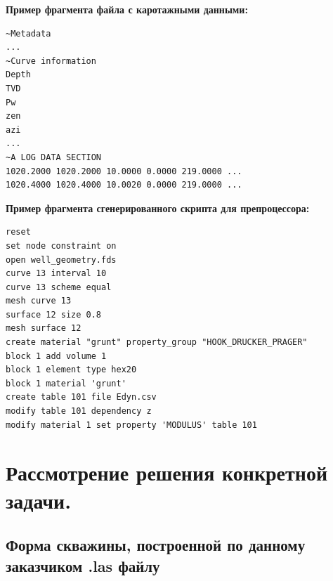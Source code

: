 \documentclass[a4paper,14pt]{scrartcl}
\begin{document}
\vspace{10mm}
\textbf{Пример фрагмента файла с каротажными данными:} 
\begin{lstlisting}[frame=single]
~Metadata
...
~Curve information
Depth
TVD
Pw
zen
azi
...
~A LOG DATA SECTION
1020.2000 1020.2000 10.0000 0.0000 219.0000 ...
1020.4000 1020.4000 10.0020 0.0000 219.0000 ...
\end{lstlisting}

\newpage
\textbf{Пример фрагмента сгенерированного скрипта для препроцессора:} 
\begin{lstlisting}[frame=single]
reset
set node constraint on
open well_geometry.fds
curve 13 interval 10
curve 13 scheme equal
mesh curve 13
surface 12 size 0.8
mesh surface 12
create material "grunt" property_group "HOOK_DRUCKER_PRAGER" 
block 1 add volume 1
block 1 element type hex20
block 1 material 'grunt'
create table 101 file Edyn.csv
modify table 101 dependency z
modify material 1 set property 'MODULUS' table 101
\end{lstlisting}


\newpage
\section{Рассмотрение решения конкретной задачи.}
\subsection{Форма скважины, построенной по данному заказчиком .las файлу}
\end{document}
